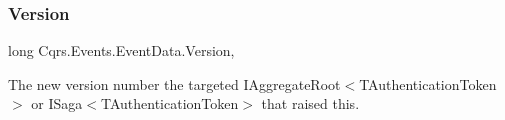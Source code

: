 \subsubsection{\texorpdfstring{Version}{Version}}
{\footnotesize\ttfamily long Cqrs.\+Events.\+Event\+Data.\+Version\hspace{0.3cm}{\ttfamily [get]}, {\ttfamily [set]}}



The new version number the targeted I\+Aggregate\+Root$<$\+T\+Authentication\+Token$>$ or I\+Saga$<$\+T\+Authentication\+Token$>$ that raised this. 

